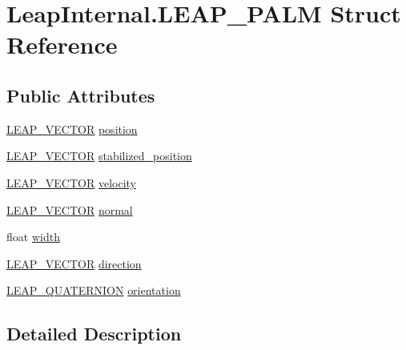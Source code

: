 \hypertarget{struct_leap_internal_1_1_l_e_a_p___p_a_l_m}{}\section{Leap\+Internal.\+L\+E\+A\+P\+\_\+\+P\+A\+LM Struct Reference}
\label{struct_leap_internal_1_1_l_e_a_p___p_a_l_m}
\subsection*{Public Attributes}
\begin{DoxyCompactItemize}
\item 
\mbox{\hyperlink{struct_leap_internal_1_1_l_e_a_p___v_e_c_t_o_r}{L\+E\+A\+P\+\_\+\+V\+E\+C\+T\+OR}} \mbox{\hyperlink{struct_leap_internal_1_1_l_e_a_p___p_a_l_m_a21afe4e4ea9fc74c4984600b76602de1}{position}}
\item 
\mbox{\hyperlink{struct_leap_internal_1_1_l_e_a_p___v_e_c_t_o_r}{L\+E\+A\+P\+\_\+\+V\+E\+C\+T\+OR}} \mbox{\hyperlink{struct_leap_internal_1_1_l_e_a_p___p_a_l_m_a7ed616f1fecaf1dd6bf8917dbea8669a}{stabilized\+\_\+position}}
\item 
\mbox{\hyperlink{struct_leap_internal_1_1_l_e_a_p___v_e_c_t_o_r}{L\+E\+A\+P\+\_\+\+V\+E\+C\+T\+OR}} \mbox{\hyperlink{struct_leap_internal_1_1_l_e_a_p___p_a_l_m_ab990a961b8ed34d114fb144550a4db2d}{velocity}}
\item 
\mbox{\hyperlink{struct_leap_internal_1_1_l_e_a_p___v_e_c_t_o_r}{L\+E\+A\+P\+\_\+\+V\+E\+C\+T\+OR}} \mbox{\hyperlink{struct_leap_internal_1_1_l_e_a_p___p_a_l_m_a5005df4d0abcc21433dba3e565e76893}{normal}}
\item 
float \mbox{\hyperlink{struct_leap_internal_1_1_l_e_a_p___p_a_l_m_a47601024191a5adf43568ed45bc9f356}{width}}
\item 
\mbox{\hyperlink{struct_leap_internal_1_1_l_e_a_p___v_e_c_t_o_r}{L\+E\+A\+P\+\_\+\+V\+E\+C\+T\+OR}} \mbox{\hyperlink{struct_leap_internal_1_1_l_e_a_p___p_a_l_m_a1fc9a264d663c099d3faf107a0d15f04}{direction}}
\item 
\mbox{\hyperlink{struct_leap_internal_1_1_l_e_a_p___q_u_a_t_e_r_n_i_o_n}{L\+E\+A\+P\+\_\+\+Q\+U\+A\+T\+E\+R\+N\+I\+ON}} \mbox{\hyperlink{struct_leap_internal_1_1_l_e_a_p___p_a_l_m_a2f5d9883d3c0cd327ba2bd02f38560c6}{orientation}}
\end{DoxyCompactItemize}


\subsection{Detailed Description}


